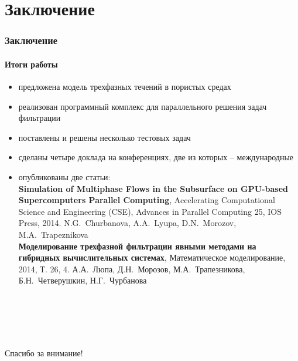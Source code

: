 \section{Заключение}
\begin{frame}
\begin{center}
\frametitle{Заключение}
\framesubtitle{Итоги работы}
\begin{itemize}
  \item предложена модель трехфазных течений в пористых средах
  \vspace{1mm}
  \item реализован программный комплекс для параллельного решения задач фильтрации
  \vspace{1mm}
  \item поставлены и решены несколько тестовых задач
  \vspace{1mm}
  \item сделаны четыре доклада на конференциях, две из которых -- международные
  \vspace{1mm}
  \item опубликованы две статьи: \\
      \small{\textbf{Simulation of Multiphase Flows in the Subsurface on GPU-based Supercomputers
      Parallel Computing}, Accelerating Computational Science and Engineering (CSE),
      Advances in Parallel Computing 25, IOS Press, 2014.
      N.G.~Churbanova, A.A.~Lyupa, D.N.~Morozov, M.A.~Trapeznikova} \\
      \vspace{1mm}
      \small{\textbf{Моделирование трехфазной фильтрации явными методами на гибридных вычислительных системах},
      Математическое моделирование, 2014, Т. 26, 4.
      А.А.~Люпа, Д.Н.~Морозов, М.А.~Трапезникова, Б.Н.~Четверушкин, Н.Г.~Чурбанова} \\
      
\end{itemize}
\end{center}
\end{frame}

\begin{frame}
\begin{center}
\frametitle{\ }
\framesubtitle{\ }
\item {\huge Спасибо за внимание!}
\end{center}
\end{frame}